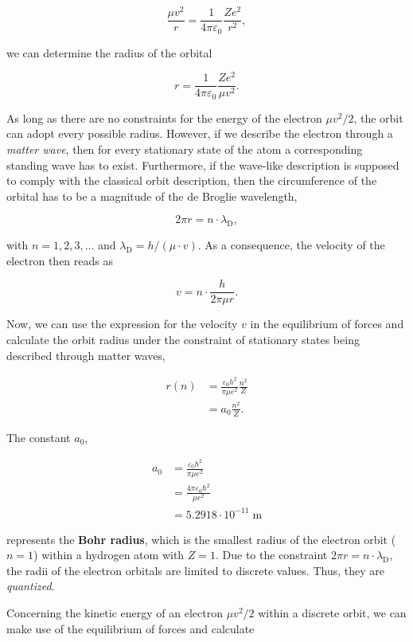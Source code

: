 \documentclass[
  a4paper,
]{book}
\begin{document}
\[
\frac{\mu  v^2}{r} = \frac{1}{4 \pi \varepsilon_0} \frac{Z e^2}{r^2} \mathrm{,}
\]

we can determine the radius of the orbital

\[
r = \frac{1}{4 \pi \varepsilon_0} \frac{Z e^2}{\mu  v^2} \mathrm{.}
\]

As long as there are no constraints for the energy of the electron
\(\mu v^2 / 2\), the orbit can adopt every possible radius. However, if
we describe the electron through a \emph{matter wave}, then for every
stationary state of the atom a corresponding standing wave has to exist.
Furthermore, if the wave-like description is supposed to comply with the
classical orbit description, then the circumference of the orbital has
to be a magnitude of the de Broglie wavelength,

\[
2 \pi r = n \cdot \lambda_{\mathrm{D}} \mathrm{,}
\]

with \(n = 1,2,3, \ldots\) and
\(\lambda_{\mathrm{D}} = h/ \left( \mu \cdot v\right)\). As a
consequence, the velocity of the electron then reads as

\[
v = n \cdot \frac{h}{2 \pi \mu r} \mathrm{.}
\]

Now, we can use the expression for the velocity \(v\) in the equilibrium
of forces and calculate the orbit radius under the constraint of
stationary states being described through matter waves,

\[
\begin{aligned}
r \left(n\right) & =  \frac{\varepsilon_0 h^2}{\pi \mu e^2} \frac{n^2}{Z}\\
{} & =  a_0 \frac{n^2}{Z} \mathrm{.}
\end{aligned}
\]

The constant \(a_0\),

\[
\begin{aligned}
a_0 & =  \frac{\varepsilon_0 h^2}{\pi \mu e^2}\\
{} & =  \frac{4 \pi \varepsilon_0 \hbar^2}{\mu e^2}\\
{} & =  5.2918 \cdot 10^{-11} \; \mathrm{m}
\end{aligned}
\]

represents the \textbf{Bohr radius}, which is the smallest radius of the
electron orbit (\(n = 1\)) within a hydrogen atom with \(Z = 1\). Due to
the constraint \(2 \pi r = n \cdot \lambda_{\mathrm{D}}\), the radii of
the electron orbitals are limited to discrete values. Thus, they are
\emph{quantized}.

Concerning the kinetic energy of an electron \(\mu v^2 / 2\) within a
discrete orbit, we can make use of the equilibrium of forces and
calculate
\end{document}

